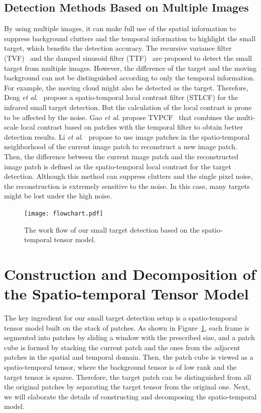 \documentclass[journal]{IEEEtran}
\begin{document}
\subsection{Detection Methods Based on Multiple Images}

By using multiple images, it can make full use of the spatial information to suppress background clutters and the temporal information to highlight the small target, which benefits the detection accuracy. The recursive variance filter (TVF)~\cite{silverman1998temporal} and the damped sinusoid filter (TTF)~\cite{caefer1998temporal} are proposed to detect the small target from multiple images. However, the difference of the target and the moving background can not be distinguished according to only the temporal information. For example, the moving cloud might also be detected as the target. Therefore, Deng \emph{et al}.~\cite{deng2016infrared} propose a spatio-temporal local contrast filter (STLCF) for the infrared small target detection. But the calculation of the local contrast is prone to be affected by the noise. Gao \emph{et al}. propose TVPCF~\cite{gao2017tvpcf} that combines the multi-scale local contrast based on patches with the temporal filter to obtain better detection results. Li \emph{et al}.~\cite{li2016novel} propose to use image patches in the spatio-temporal neighborhood of the current image patch to reconstruct a new image patch. Then, the difference between the current image patch and the reconstructed image patch is defined as the spatio-temporal local contrast for the target detection. Although this method can suppress clutters and the single pixel noise, the reconstruction is extremely sensitive to the noise. In this case, many targets might be lost under the high noise.

\begin{figure}[htb]
  \centering
  \texttt{[image: flowchart.pdf]}
  \caption{The work flow of our small target detection based on the spatio-temporal tensor model.}
  \label{fig:flow_chart}
\end{figure}


\section{Construction and Decomposition of the Spatio-temporal Tensor Model}

The key ingredient for our small target detection setup is a spatio-temporal tensor model built on the stack of patches.
As shown in Figure~\ref{fig:flow_chart}, each frame is segmented into patches by sliding a window with the prescribed size, and a patch cube is formed by stacking the current patch and the ones from the adjacent patches in the spatial and temporal domain. Then, the patch cube is viewed as a spatio-temporal tensor, where the background tensor is of low rank and the target tensor is sparse. Therefore, the target patch can be distinguished from all the original patches by separating the target tensor from the original one. Next, we will elaborate the details of constructing and decomposing the spatio-temporal model.
\end{document}
